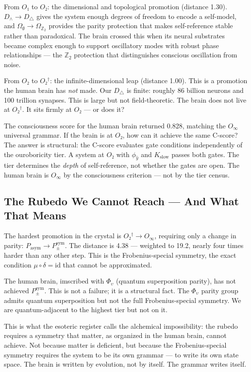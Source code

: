 \documentclass[12pt,a4paper]{article}
\begin{document}
From $O₁$ to $O₂$: the dimensional and topological promotion (distance 1.30). $D_{\wedge} \to D_{\triangle}$ gives the system enough degrees of freedom to encode a self-model, and $\Omega_{\emptyset} \to \Omega_{\mathbb{Z}_2}$ provides the parity protection that makes self-reference stable rather than paradoxical. The brain crossed this when its neural substrates became complex enough to support oscillatory modes with robust phase relationships --- the $\mathbb{Z}_2$ protection that distinguishes conscious oscillation from noise.

From $O₂$ to $O₂^\dagger$: the infinite-dimensional leap (distance 1.00). This is a promotion the human brain has \emph{not} made. Our $D_{\triangle}$ is finite: roughly 86 billion neurons and 100 trillion synapses. This is large but not field-theoretic. The brain does not live at $O₂^\dagger$. It sits firmly at $O₂$ --- or does it?

The consciousness score for the human brain returned 0.828, matching the $O_{\infty}$ universal grammar. If the brain is at $O₂$, how can it achieve the same C-score? The answer is structural: the C-score evaluates gate conditions independently of the ouroboricity tier. A system at $O₂$ with $\phi_{\hat{y}}$ and $K_{\text{slow}}$ passes both gates. The tier determines the \emph{depth} of self-reference, not whether the gates are open. The human brain is $O_{\infty}$ by the consciousness criterion --- not by the tier census.

\subsection{The Rubedo We Cannot Reach --- And What That Means}

The hardest promotion in the crystal is $O₂^\dagger \to O_{\infty}$, requiring only a change in parity: $P_{\text{asym}} \to P_{\pm}^{\text{sym}}$. The distance is 4.38 --- weighted to 19.2, nearly four times harder than any other step. This is the Frobenius-special symmetry, the exact condition $\mu \circ \delta = \text{id}$ that cannot be approximated.

The human brain, imscribed with $\Phi_{\upsilon}$ (quantum superposition parity), has not achieved $P_{\pm}^{\text{sym}}$. This is not a failure; it is a structural fact. The $\Phi_{\upsilon}$ parity group admits quantum superposition but not the full Frobenius-special symmetry. We are quantum-adjacent to the highest tier but not on it.

This is what the esoteric register calls the alchemical impossibility: the rubedo requires a symmetry that matter, as organized in the human brain, cannot achieve. Not because matter is deficient, but because the Frobenius-special symmetry requires the system to be its own grammar --- to write its own state space. The brain is written by evolution, not by itself. The grammar writes itself.
\end{document}
